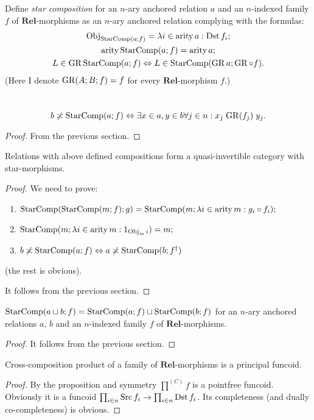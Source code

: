 Define \emph{star composition} for an $n$-ary anchored relation $a$
and an $n$-indexed family $f$ of $\mathbf{Rel}$-morphisms as an
$n$-ary anchored relation complying with the formulas: 
\begin{gather*}
\operatorname{Obj}_{\operatorname{StarComp}(a;f)}=\lambda i\in\operatorname{arity} a:\operatorname{Dst} f_{i};\\
\operatorname{arity}\operatorname{StarComp}(a;f)=\operatorname{arity} a;\\
L\in\operatorname{GR}\operatorname{StarComp}(a;f)\Leftrightarrow L\in\operatorname{StarComp}(\operatorname{GR} a;\operatorname{GR}\circ f).
\end{gather*}
(Here I denote $\operatorname{GR}(A;B;f)=f$ for every $\mathbf{Rel}$-morphism $f$.)
\begin{prop}
~
\[b\not\asymp\operatorname{StarComp}(a;f)\Leftrightarrow\exists x\in a,y\in b\forall j\in n:x_{j}\mathrel{\operatorname{GR}(f_{j})}y_{j}.\]\end{prop}
\begin{proof}
From the previous section.\end{proof}
\begin{thm}
Relations with above defined compositions form a quasi-invertible
category with star-morphisms.\end{thm}
\begin{proof}
We need to prove:
\begin{enumerate}
\item $\operatorname{StarComp}(\operatorname{StarComp}(m;f);g)=\operatorname{StarComp}(m;\lambda i\in\operatorname{arity} m:g_{i}\circ f_{i});$
\item $\operatorname{StarComp}(m;\lambda i\in\operatorname{arity} m:1_{\operatorname{Obj}_{m}i})=m;$
\item $b\not\asymp\operatorname{StarComp}(a;f)\Leftrightarrow a\not\asymp\operatorname{StarComp}(b;f^{\dagger})$
\end{enumerate}
(the rest is obvious).

It follows from the previous section.\end{proof}
\begin{prop}
$\operatorname{StarComp}(a\sqcup b;f)=\operatorname{StarComp}(a;f)\sqcup\operatorname{StarComp}(b;f)$ for an
$n$-ary anchored relations $a$, $b$ and an $n$-indexed family
$f$ of $\mathbf{Rel}$-morphisms.\end{prop}
\begin{proof}
It follows from the previous section.\end{proof}
\begin{thm}
Cross-composition product of a family of $\mathbf{Rel}$-morphisms
is a principal funcoid.\end{thm}
\begin{proof}
By the proposition and symmetry $\prod^{(C)}f$ is a pointfree funcoid.
Obviously it is a funcoid $\prod_{i\in n}\operatorname{Src} f_{i}\rightarrow\prod_{i\in n}\operatorname{Dst} f_{i}$.
Its completeness (and dually co-completeness) is obvious.
\end{proof}

